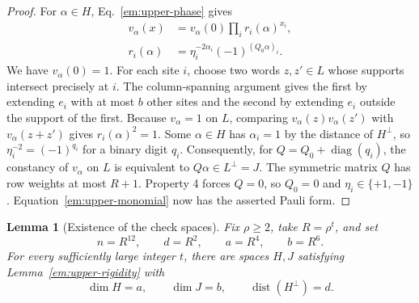 \documentclass[aps,prl,reprint,notitlepage,nofootinbib,nobibnotes]{revtex4-2}
\newtheorem{lemma}{Lemma}
\begin{document}
\begin{proof}
For \(\alpha\in H\), Eq.~\eqref{em:upper-phase} gives
\[
 \begin{aligned}
 v_\alpha(x)&=v_\alpha(0)\prod_i r_i(\alpha)^{x_i},\\
 r_i(\alpha)&=\eta_i^{-2\alpha_i}(-1)^{(Q_0\alpha)_i}.
 \end{aligned}
\]
We have \(v_\alpha(0)=1\). For each site \(i\), choose two words \(z,z'\in L\) whose supports intersect precisely at \(i\). The column-spanning argument gives the first by extending \(e_i\) with at most \(b\) other sites and the second by extending \(e_i\) outside the support of the first. Because \(v_\alpha=1\) on \(L\), comparing \(v_\alpha(z)v_\alpha(z')\) with \(v_\alpha(z+z')\) gives \(r_i(\alpha)^2=1\). Some \(\alpha\in H\) has \(\alpha_i=1\) by the distance of \(H^\perp\), so \(\eta_i^{-2}=(-1)^{q_i}\) for a binary digit \(q_i\). Consequently, for \(Q=Q_0+\operatorname{diag}(q_i)\), the constancy of \(v_\alpha\) on \(L\) is equivalent to \(Q\alpha\in L^\perp=J\). The symmetric matrix \(Q\) has row weights at most \(R+1\). Property 4 forces \(Q=0\), so \(Q_0=0\) and \(\eta_i\in\{+1,-1\}\). Equation~\eqref{em:upper-monomial} now has the asserted Pauli form.
\end{proof}

\begin{lemma}[Existence of the check spaces]
\label{em:upper-existence}
Fix \(\rho\ge2\), take \(R=\rho^t\), and set
\begin{equation}\label{em:upper-parameters}
 n=R^{12},\qquad d=R^2,\qquad a=R^4,\qquad b=R^6.
\end{equation}
For every sufficiently large integer \(t\), there are spaces \(H,J\) satisfying Lemma~\ref{em:upper-rigidity} with
\[
 \dim H=a,\qquad \dim J=b,\qquad
 \operatorname{dist}(H^\perp)=d.
\]
\end{lemma}
\end{document}
